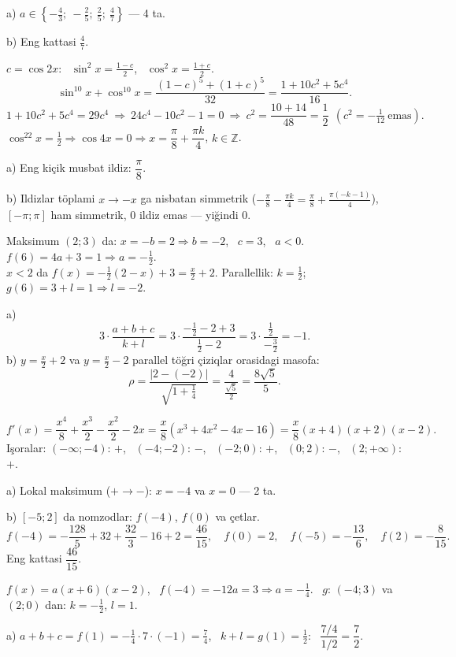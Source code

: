 a) $a\in\left\{-\frac43;\ -\frac25;\ \frac25;\ \frac47\right\}$ — 4 ta.

b) Eng kattasi $\frac47$.

\newpage
{}
$c=\cos2x$: \ $\sin^2x=\frac{1-c}2$, \ $\cos^2x=\frac{1+c}2$.
\[\sin^{10}x+\cos^{10}x=\frac{(1-c)^5+(1+c)^5}{32}=\frac{1+10c^2+5c^4}{16}.\]
\[1+10c^2+5c^4=29c^4\ \Rightarrow\ 24c^4-10c^2-1=0\ \Rightarrow\ c^2=\frac{10+14}{48}=\frac12\ \ \left(c^2=-\tfrac1{12}\ \text{emas}\right).\]
$\cos^22x=\frac12\Rightarrow\cos4x=0\Rightarrow x=\dfrac\pi8+\dfrac{\pi k}4$, $k\in\mathbb Z$.

a) Eng kiçik musbat ildiz: $\dfrac\pi8$.

b) Ildizlar töplami $x\to-x$ ga nisbatan simmetrik ($-\frac\pi8-\frac{\pi k}4=\frac\pi8+\frac{\pi(-k-1)}4$), $[-\pi;\pi]$ ham simmetrik, $0$ ildiz emas — yiğindi $0$.

\newpage
{}
Maksimum $(2;3)$ da: $x=-b=2\Rightarrow b=-2$, \ $c=3$, \ $a<0$. \ $f(6)=4a+3=1\Rightarrow a=-\frac12$.\\
$x<2$ da $f(x)=-\frac12(2-x)+3=\frac x2+2$. Parallellik: $k=\frac12$; \ $g(6)=3+l=1\Rightarrow l=-2$.

a) \[3\cdot\frac{a+b+c}{k+l}=3\cdot\frac{-\frac12-2+3}{\frac12-2}=3\cdot\frac{\frac12}{-\frac32}=-1.\]
b) $y=\frac x2+2$ va $y=\frac x2-2$ parallel töğri çiziqlar orasidagi masofa:
\[\rho=\frac{|2-(-2)|}{\sqrt{1+\frac14}}=\frac4{\frac{\sqrt5}2}=\frac{8\sqrt5}5.\]

\newpage
{}
\[f'(x)=\frac{x^4}8+\frac{x^3}2-\frac{x^2}2-2x=\frac x8\left(x^3+4x^2-4x-16\right)=\frac x8(x+4)(x+2)(x-2).\]
Işoralar: $(-\infty;-4)$: $+$, \ $(-4;-2)$: $-$, \ $(-2;0)$: $+$, \ $(0;2)$: $-$, \ $(2;+\infty)$: $+$.

a) Lokal maksimum ($+\to-$): $x=-4$ va $x=0$ — 2 ta.

b) $[-5;2]$ da nomzodlar: $f(-4)$, $f(0)$ va çetlar.
\[f(-4)=-\frac{128}5+32+\frac{32}3-16+2=\frac{46}{15},\quad f(0)=2,\quad f(-5)=-\frac{13}6,\quad f(2)=-\frac8{15}.\]
Eng kattasi $\dfrac{46}{15}$.

\newpage
{}
$f(x)=a(x+6)(x-2)$, \ $f(-4)=-12a=3\Rightarrow a=-\frac14$. \ $g$: $(-4;3)$ va $(2;0)$ dan: $k=-\frac12$, $l=1$.

a) $a+b+c=f(1)=-\frac14\cdot7\cdot(-1)=\frac74$, \ $k+l=g(1)=\frac12$: \ $\dfrac{7/4}{1/2}=\dfrac72$.

